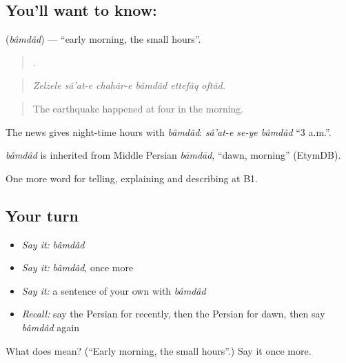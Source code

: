\subsection*{You'll want to know: }
\textbf{} (\emph{bâmdâd}) — \textquotedblleft{}early morning, the small hours\textquotedblright{}.

\begin{quote}
     .
\end{quote}

\begin{quote}
\emph{Zelzele sâ'at-e chahâr-e bâmdâd ettefâq oftâd.}
\end{quote}

\begin{quote}
The earthquake happened at four in the morning.
\end{quote}

The news gives night-time hours with \emph{bâmdâd}: \emph{sâ'at-e se-ye bâmdâd} \textquotedblleft{}3 a.m.\textquotedblright{}.

\begin{cousinweb}
\emph{bâmdâd} is inherited from Middle Persian \emph{bāmdād}, \textquotedblleft{}dawn, morning\textquotedblright{} (EtymDB).
\end{cousinweb}

\begin{grammarlens}[title={What you've built}]
One more word for telling, explaining and describing at B1.
\end{grammarlens}

\subsection*{Your turn}
\begin{itemize}
\raggedright
  \item \emph{Say it:} \emph{bâmdâd}
  \item \emph{Say it:} \emph{bâmdâd}, once more
  \item \emph{Say it:} a sentence of your own with \emph{bâmdâd}
  \item \emph{Recall:} say the Persian for recently, then the Persian for dawn, then say \emph{bâmdâd} again
\end{itemize}

\begin{tcolorbox}[breakable,colback=teal!4,colframe=teal!35!black,title={Before you move on}]
What does  mean? (\textquotedblleft{}Early morning, the small hours\textquotedblright{}.) Say it once more.
\end{tcolorbox}
